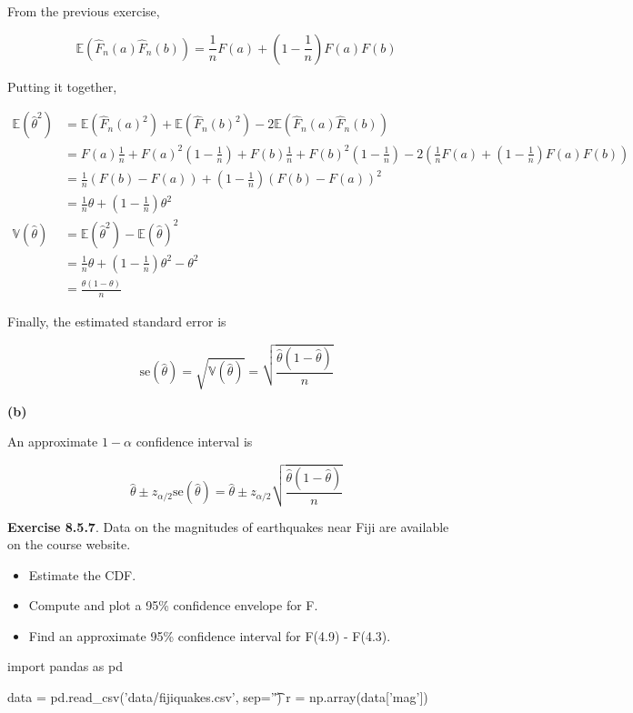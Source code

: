 From the previous exercise,

\[ \mathbb{E}(\hat{F}_{n}(a)\hat{F}_{n}(b)) = \frac{1}{n} F(a) + \left( 1 - \frac{1}{n}\right) F(a)F(b) \]

Putting it together,

\begin{align*}
\mathbb{E}(\hat{\theta}^{2}) 
&= \mathbb{E}(\hat{F}_{n}(a)^{2}) + \mathbb{E}(\hat{F}_{n}(b)^{2}) - 2 \mathbb{E}(\hat{F}_{n}(a)\hat{F}_{n}(b)) \\
&=   F(a) \frac{1}{n} + F(a)^{2} \left(1 - \frac{1}{n} \right) +  F(b) \frac{1}{n} + F(b)^{2} \left(1 - \frac{1}{n} \right) - 2 \left( \frac{1}{n} F(a) + \left( 1 - \frac{1}{n}\right) F(a)F(b) \right) \\
&=  \frac{1}{n} \left(F(b) - F(a)\right) + \left( 1 - \frac{1}{n}\right) \left( F(b) - F(a) \right)^{2} \\
&=  \frac{1}{n} \theta + \left( 1 - \frac{1}{n} \right) \theta^{2} \\
\mathbb{V}(\hat{\theta}) &=  \mathbb{E}(\hat{\theta}^{2}) - \mathbb{E}(\hat{\theta})^{2} \\
&=  \frac{1}{n} \theta + \left( 1 - \frac{1}{n} \right) \theta^{2} - \theta^{2} \\
&= \frac{\theta (1 - \theta)}{n} 
\end{align*}

Finally, the estimated standard error is

\[\text{se}(\hat{\theta}) = \sqrt{\mathbb{V}(\hat{\theta})} = \sqrt{\frac{\hat{\theta}(1 - \hat{\theta})}{n}}\]

\textbf{(b)}

An approximate \(1 - \alpha\) confidence interval is

\[ \hat{\theta} \pm z_{\alpha/2}\text{se}(\hat{\theta}) = \hat{\theta} \pm z_{\alpha/2} \sqrt{\frac{\hat{\theta}(1 - \hat{\theta})}{n}}\]

\textbf{Exercise 8.5.7}. Data on the magnitudes of earthquakes near Fiji
are available on the course website.

\begin{itemize}[tightlist]
\item
  Estimate the CDF.
\item
  Compute and plot a 95\% confidence envelope for F.
\item
  Find an approximate 95\% confidence interval for F(4.9) - F(4.3).
\end{itemize}

\begin{python}
import pandas as pd

data = pd.read_csv('data/fijiquakes.csv', sep='\t')
r = np.array(data['mag'])
\end{python}

